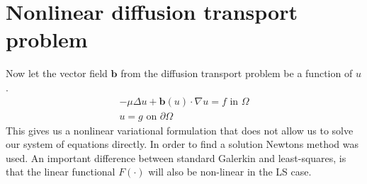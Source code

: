 \section{Nonlinear diffusion transport problem}
Now let the vector field $\mathbf{b}$ from the diffusion transport problem be a function of $u$. 
\begin{align}
	-\mu \Delta u + \mathbf{b}(u) \cdot \nabla u = f \text{ in } \Omega \\
	u = g \text{ on } \partial \Omega
	\label{eq:DiffTransNonLin}
\end{align}
This gives us a nonlinear variational formulation that does not allow us to solve our system of equations directly. In order to find a solution Newtons method was used. An important difference between standard Galerkin and least-squares, is that the linear functional $F(\cdot)$ will also be non-linear in the LS case. 



